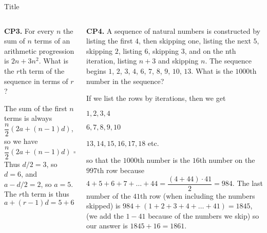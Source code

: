 \documentclass[9pt,aspectratio=169]{beamer}
\begin{document}
\begin{frame}{Title}
  \begin{columns}[T]
    \begin{column}{0.5\textwidth}
      \begin{problem}
        \textbf{CP3.} For every $n$ the sum of $n$ terms of an arithmetic progression is $2n + 3n^2$. What is the $r$th term of
        the sequence in terms of $r$?
      \end{problem}
      The sum of the first $n$ terms is always $\dfrac{n}{2} (2a + (n-1)d)$, so we have 
      \[ \frac{n}{2}(2a + (n-1)d)=an + dn^2/2 -dn/2. \]
      Thus $d/2 = 3$, so $d = 6$, and $a-d/2 = 2$, so $a=5$. The $r$th term is thus
      \[ a + (r-1)d = 5+6(r-1)=\boxed{6r-1}. \]
    \end{column}
    \begin{column}{0.5\textwidth}
      \begin{problem}
        \textbf{CP4.} A sequence of natural numbers is constructed by listing the first
        $4$, then skipping one, listing the next $5$, skipping $2$, listing $6$, skipping $3$, and on the nth
        iteration, listing $n + 3$ and skipping $n$. The sequence begins $1$, $2$, $3$, $4$, $6$, $7$, $8$, $9$, $10$, $13$.
        What is the $1000$th number in the sequence?
      \end{problem}
      If we list the rows by iterations, then we get

      $1,2,3,4$

      $6,7,8,9,10$

      $13,14,15,16,17,18$ etc.

      so that the $1000$th number is the $16$th number on the $997$th row because $4+5+6+7+\dots+44 = \dfrac{(4+44)\cdot 41}{2}=984$. The last number of the $41$th row (when including the numbers skipped) is $984 + (1+2+3+4+\dots+41)= 1845$, (we add the $1-41$ because of the numbers we skip) so our answer is $1845 + 16 = \boxed{1861}$.
    \end{column}
  \end{columns}
\end{frame}

\end{document}
